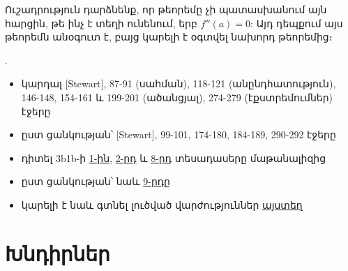 Ուշադրություն դարձնենք, որ թեորեմը չի պատասխանում այն հարցին, թե ինչ է տեղի ունենում, երբ $f''(a)=0$: Այդ դեպքում այս թեորեմն անօգուտ է, բայց կարելի է օգտվել նախորդ թեորեմից։


\bigskip 

\begin{theory}
.
\begin{itemize}
\item կարդալ [{\rm Stewart}], 87-91 (սահման), 118-121 (անընդհատու\-թյուն), 146-148, 154-161 և 199-201 (ածանցյալ), 274-279 (էքստրեմումներ) էջերը  
\item ըստ ցանկության՝ [{\rm Stewart}], 99-101, 174-180, 184-189, 290-292 էջերը
\item դիտել  {\rm 3b1b}-ի \href{https://www.3blue1brown.com/lessons/essence-of-calculus}{1-ին}, \href{https://www.3blue1brown.com/lessons/derivatives}{2-րդ} և \href{https://www.3blue1brown.com/lessons/limits}{8-րդ} տեսադասերը մաթանալիզից 
\item ըստ ցանկության՝ նաև \href{https://www.3blue1brown.com/lessons/epsilon-delta}{9-րդը}
\item կարելի է նաև գտնել լուծված վարժություններ \href{https://tutorial.math.lamar.edu/Classes/CalcI/CalcI.aspx}{այստեղ}
\end{itemize}
\end{theory}

\newpage

\section{Խնդիրներ}

